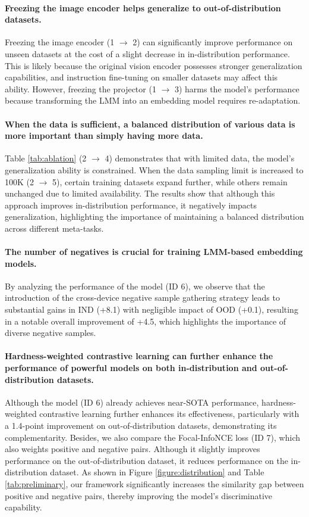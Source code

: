 \documentclass[11pt]{article}
\begin{document}
\paragraph{Freezing the image encoder helps generalize to out-of-distribution datasets.} Freezing the image encoder (1 $\rightarrow$ 2) can significantly improve performance on unseen datasets at the cost of a slight decrease in in-distribution performance. This is likely because the original vision encoder possesses stronger generalization capabilities, and instruction fine-tuning on smaller datasets may affect this ability. However, freezing the projector (1 $\rightarrow$ 3) harms the model's performance because transforming the LMM into an embedding model requires re-adaptation.

\paragraph{When the data is sufficient, a balanced distribution of various data is more important than simply having more data.} Table \ref{tab:ablation} (2 $\rightarrow$ 4) demonstrates that with limited data, the model's generalization ability is constrained. When the data sampling limit is increased to 100K (2 $\rightarrow$ 5), certain training datasets expand further, while others remain unchanged due to limited availability. The results show that although this approach improves in-distribution performance, it negatively impacts generalization, highlighting the importance of maintaining a balanced distribution across different meta-tasks.

\paragraph{The number of negatives is crucial for training LMM-based embedding models.} By analyzing the performance of the model (ID 6), we observe that the introduction of the cross-device negative sample gathering strategy leads to substantial gains in IND (+8.1) with negligible impact of OOD (+0.1), resulting in a notable overall improvement of +4.5, which highlights the importance of diverse negative samples.

\paragraph{Hardness-weighted contrastive learning can further enhance the performance of powerful models on both in-distribution and out-of-distribution datasets.} Although the model (ID 6) already achieves near-SOTA performance, hardness-weighted contrastive learning further enhances its effectiveness, particularly with a 1.4-point improvement on out-of-distribution datasets, demonstrating its complementarity. Besides, we also compare the Focal-InfoNCE loss (ID 7), which also weights positive and negative pairs. Although it slightly improves performance on the out-of-distribution dataset, it reduces performance on the in-distribution dataset.
As shown in Figure \ref{figure:distribution} and Table \ref{tab:preliminary}, our framework significantly increases the similarity gap between positive and negative pairs, thereby improving the model's discriminative capability.
\end{document}

